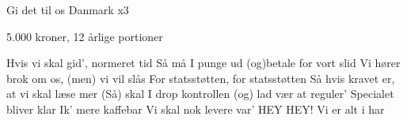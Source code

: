 \documentclass[a4paper,12pt]{article}
\begin{document}
\begin{song}
Gi det til os Danmark x3

5.000 kroner, 12 årlige portioner

Hvis vi skal gid', normeret tid
Så må I punge ud (og)betale for vort slid
Vi hører brok om os, (men) vi vil slås
For statsstøtten, for statsstøtten
Så hvis kravet er, at vi skal læse mer
(Så) skal I drop kontrollen (og) lad vær at reguler'
Specialet bliver klar
Ik' mere kaffebar
Vi skal nok levere var'
HEY HEY! Vi er alt i har





\end{song}
\end{document}
